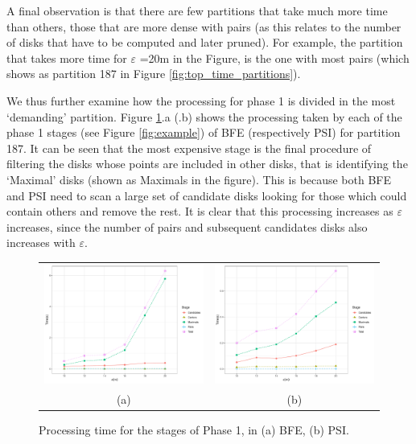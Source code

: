 A final observation is that there are few partitions that take much more time than others, those that are more dense with pairs (as this relates to the number of disks that have to be computed and later pruned). For example, the partition that takes more time for $\varepsilon$ =20m in the Figure, is the one with most pairs (which shows as partition 187 in Figure \ref{fig:top_time_partitions}). 

We thus further examine how the processing for phase 1 is divided in the most `demanding' partition. Figure \ref{fig:dense_stages}.a (.b) shows the processing taken by each of the phase 1 stages (see Figure \ref{fig:example}) of BFE (respectively PSI) for partition 187. 
It can be seen that the most expensive stage is the final procedure of filtering the disks whose points are included in other disks, that is identifying the `Maximal' disks (shown as Maximals in the figure). This is because both BFE and PSI need to scan a large set of candidate disks looking for those which could contain others and remove the rest. It is clear that this processing increases as $\varepsilon$ increases, since the number of pairs and subsequent candidates disks also increases with $\varepsilon$.

\begin{figure}
    \centering
    \begin{tabular}{c c}
        \includegraphics[width=0.49\linewidth] {figures/plots/09_dense_stages/dense_stages_bfe.pdf} &
        \includegraphics[width=0.49\linewidth] {figures/plots/09_dense_stages/dense_stages_psi.pdf} \\
        (a) & (b) \\
    \end{tabular}
    \caption{Processing time for the stages of Phase 1, in (a) BFE, (b) PSI.}\label{fig:dense_stages}
\end{figure}


